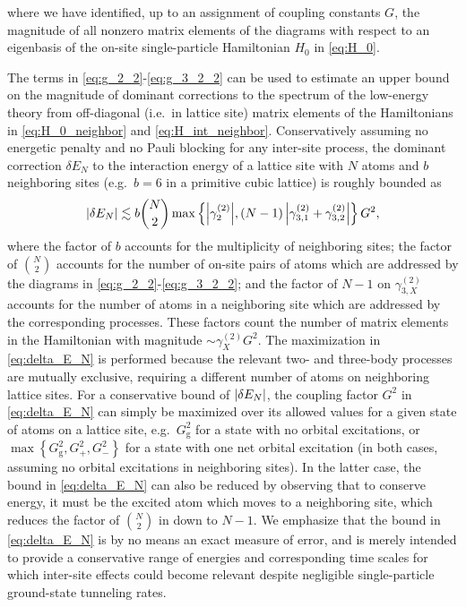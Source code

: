 \documentclass[preprint,showkeys,nofootinbib]{revtex4-1}
\newcommand{\p}[1]{\left(#1\right)} %
\renewcommand{\set}[1]{\left\{#1\right\}} %
\newcommand{\g}{\text{g}}
\newcommand{\1}{\mathds{1}}
\begin{document}
where we have identified, up to an assignment of coupling constants
$G$, the magnitude of all nonzero matrix elements of the diagrams with
respect to an eigenbasis of the on-site single-particle Hamiltonian
$H_0$ in \eqref{eq:H_0}.

The terms in \eqref{eq:g_2_2}-\eqref{eq:g_3_2_2} can be used to
estimate an upper bound on the magnitude of dominant corrections to
the spectrum of the low-energy theory from off-diagonal (i.e.~in
lattice site) matrix elements of the Hamiltonians in
\eqref{eq:H_0_neighbor} and \eqref{eq:H_int_neighbor}.  Conservatively
assuming no energetic penalty and no Pauli blocking for any inter-site
process, the dominant correction $\delta E_N$ to the interaction
energy of a lattice site with $N$ atoms and $b$ neighboring sites
(e.g.~$b=6$ in a primitive cubic lattice) is roughly bounded as
\begin{align}
  \abs{\delta E_N} \lesssim b {N\choose 2}
  \max\set{\abs{\gamma_2^{(2)}},
    \p{N-1} \abs{\gamma_{3,1}^{(2)} + \gamma_{3,2}^{(2)}}} G^2,
  \label{eq:delta_E_N}
\end{align}
where the factor of $b$ accounts for the multiplicity of neighboring
sites; the factor of ${N\choose2}$ accounts for the number of on-site
pairs of atoms which are addressed by the diagrams in
\eqref{eq:g_2_2}-\eqref{eq:g_3_2_2}; and the factor of $N-1$ on
$\gamma_{3,X}^{(2)}$ accounts for the number of atoms in a neighboring
site which are addressed by the corresponding processes.  These
factors count the number of matrix elements in the Hamiltonian with
magnitude $\sim\gamma_X^{(2)}G^2$.  The maximization in
\eqref{eq:delta_E_N} is performed because the relevant two- and
three-body processes are mutually exclusive, requiring a different
number of atoms on neighboring lattice sites.  For a conservative
bound of $\abs{\delta E_N}$, the coupling factor $G^2$ in
\eqref{eq:delta_E_N} can simply be maximized over its allowed values
for a given state of atoms on a lattice site, e.g.~$G_\g^2$ for a
state with no orbital excitations, or $\max\set{G_\g^2,G_+^2,G_-^2}$
for a state with one net orbital excitation (in both cases, assuming
no orbital excitations in neighboring sites).  In the latter case, the
bound in \eqref{eq:delta_E_N} can also be reduced by observing that to
conserve energy, it must be the excited atom which moves to a
neighboring site, which reduces the factor of ${N\choose2}$ in down to
$N-1$.  We emphasize that the bound in \eqref{eq:delta_E_N} is by no
means an exact measure of error, and is merely intended to provide a
conservative range of energies and corresponding time scales for which
inter-site effects could become relevant despite negligible
single-particle ground-state tunneling rates.
\end{document}

